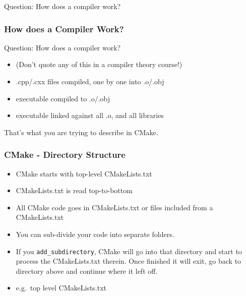 Question: How does a compiler work?

\subsubsection{How does a Compiler
Work?}\label{how-does-a-compiler-work}

Question: How does a compiler work?

\begin{itemize}
\itemsep1pt\parskip0pt
\item
  (Don't quote any of this in a compiler theory course!)
\item
  .cpp/.cxx files compiled, one by one into .o/.obj
\item
  executable compiled to .o/.obj
\item
  executable linked against all .o, and all libraries
\end{itemize}

That's what you are trying to describe in CMake.

\subsubsection{CMake - Directory
Structure}\label{cmake---directory-structure}

\begin{itemize}
\itemsep1pt\parskip0pt
\item
  CMake starts with top-level CMakeLists.txt
\item
  CMakeLists.txt is read top-to-bottom
\item
  All CMake code goes in CMakeLists.txt or files included from a
  CMakeLists.txt
\item
  You can sub-divide your code into separate folders.
\item
  If you \texttt{add\_subdirectory}, CMake will go into that directory
  and start to process the CMakeLists.txt therein. Once finished it will
  exit, go back to directory above and continue where it left off.
\item
  e.g.~top level CMakeLists.txt
\end{itemize}

\begin{Shaded}
\begin{Highlighting}[]
 
  \NormalTok{()}
  \NormalTok{()}
\NormalTok{()}
\end{Highlighting}
\end{Shaded}

